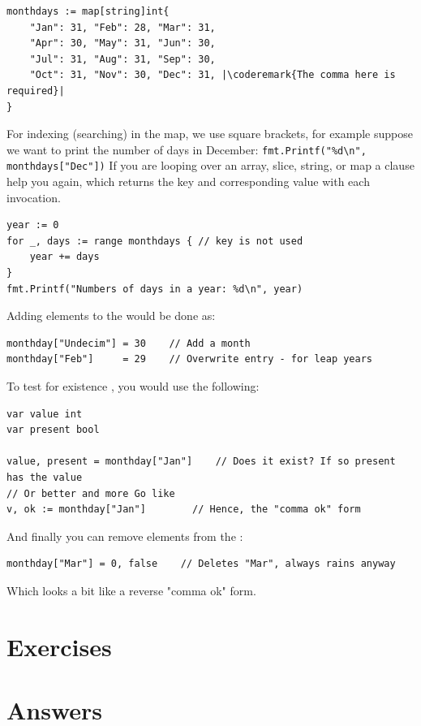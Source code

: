\begin{lstlisting}
monthdays := map[string]int{
	"Jan": 31, "Feb": 28, "Mar": 31, 
	"Apr": 30, "May": 31, "Jun": 30, 
	"Jul": 31, "Aug": 31, "Sep": 30, 
	"Oct": 31, "Nov": 30, "Dec": 31, |\coderemark{The comma here is required}|
}		    
\end{lstlisting}
For indexing (searching) in the map, we use square brackets, for example
suppose we want to print the
number of days in December: \lstinline{fmt.Printf("%d\n", monthdays["Dec"])}\newline
If you are looping over an array, slice, string, or map a
clause help you again, which returns the key and corresponding value
with each invocation.
\begin{lstlisting}
year := 0
for _, days := range monthdays { // key is not used
    year += days
}
fmt.Printf("Numbers of days in a year: %d\n", year)
\end{lstlisting}
Adding elements to the   would be done as:
\begin{lstlisting}
monthday["Undecim"] = 30	// Add a month
monthday["Feb"]     = 29	// Overwrite entry - for leap years
\end{lstlisting}
To test for existence , you would use the
following\cite{go_course_day2}:
\begin{lstlisting}
var value int
var present bool

value, present = monthday["Jan"]	// Does it exist? If so present has the value
// Or better and more Go like
v, ok := monthday["Jan"]		// Hence, the "comma ok" form
\end{lstlisting}
And finally you can remove elements  from the :
\begin{lstlisting}
monthday["Mar"] = 0, false    // Deletes "Mar", always rains anyway
\end{lstlisting}
Which looks a bit like a reverse "comma ok" form.

\section{Exercises}







\cleardoublepage
\section{Answers}
\shipoutAnswer
